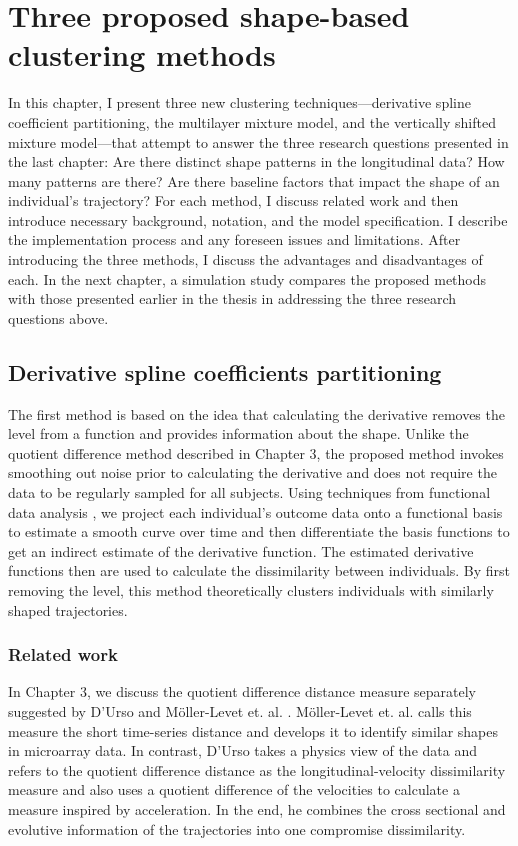 \chapter{Three proposed shape-based clustering methods}
In this chapter, I present three new clustering techniques---derivative spline coefficient partitioning, the multilayer mixture model, and the vertically shifted mixture model---that attempt to answer the three research questions presented in the last chapter: Are there distinct shape patterns in the longitudinal data? How many patterns are there? Are there baseline factors that impact the shape of an individual's trajectory? For each method, I discuss related work and then introduce necessary background, notation, and the model specification. I describe the implementation process and any foreseen issues and limitations. After introducing the three methods, I discuss the advantages and disadvantages of each. In the next chapter, a simulation study compares the proposed methods with those presented earlier in the thesis in addressing the three research questions above.

\section{Derivative spline coefficients partitioning}
The first method is based on the idea that calculating the derivative removes the level from a function and provides information about the shape. Unlike the quotient difference method described in Chapter 3,  the proposed method invokes smoothing out noise prior to calculating the derivative and does not require the data to be regularly sampled for all subjects. Using techniques from functional data analysis \cite{ramsay2002}, we project each individual's outcome data onto a functional basis to estimate a smooth curve over time and then differentiate the basis functions to get an indirect estimate of the derivative function. The estimated derivative functions then are used to calculate the dissimilarity between individuals. By first removing the level, this  method theoretically clusters individuals with similarly shaped trajectories.

\subsection{Related work}
In Chapter 3, we discuss the quotient difference distance measure separately suggested by D'Urso and M{\"o}ller-Levet et. al. \cite{d2000,moller2003}. M{\"o}ller-Levet et. al. calls this measure the short time-series distance and develops it to identify similar shapes in microarray data. In contrast, D'Urso takes a physics view of the data and refers to the quotient difference distance as the longitudinal-velocity dissimilarity measure and also uses a quotient difference of the velocities to calculate a measure inspired by acceleration. In the end, he combines the cross sectional and evolutive information of the trajectories into one compromise dissimilarity.


